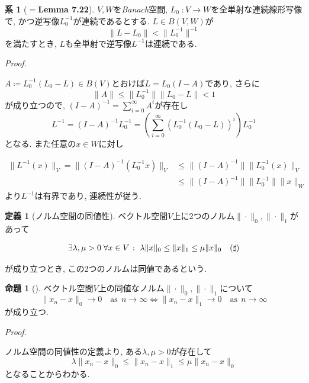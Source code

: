 \documentclass{jsarticle}
\renewenvironment{proof}[1][Proof]{%
\begin{proofbox}%
\textit{#1. }\ignorespaces
}{%
\hfill\qedsymbol%
\end{proofbox}%
}
\theoremstyle{definition}
\newtheorem{prop}[thm]{命題}
\newtheorem{cor}[thm]{系}
\newtheorem{dfn}[thm]{定義}
\begin{document}
\begin{cor}[$=$\textbf{Lemma 7.22}]
$V, W$を\textit{Banach}空間, $L_0\;\colon V\to W$を全単射な連続線形写像で, かつ逆写像$L_0^{-1}$が連続であるとする. $L\in B(V, W)$が
\[
\|L-L_0\|<\|L_0^{-1}\|^{-1}
\]
を満たすとき, $L$も全単射で逆写像$L^{-1}$は連続である.
\end{cor}
\begin{proof}
$A \coloneq L_0^{-1}(L_0-L)\in B(V)$とおけば$L= L_0(I-A)$であり, さらに
\[
\|A\|\le \|L_0^{-1}\|\|L_0-L\| < 1
\]
が成り立つので, $(I-A)^{-1}= \sum_{i=0}^{\infty}A^i$が存在し
\[
L^{-1} = (I-A)^{-1}L_0^{-1}= \left(\sum_{i=0}^{\infty} (L_0^{-1}(L_0-L))^i\right)L_0^{-1}
\]
となる. また任意の$x\in W$に対し

\begin{align*}
\|L^{-1}(x)\|_{V} = \|(I-A)^{-1}(L_0^{-1}x)\|_{V} & \le \|(I-A)^{-1}\|\|L_0^{-1}(x)\|_{V} \\
&\le \|(I-A)^{-1}\|\|L_0^{-1}\|\|x\|_W
\end{align*}
より$L^{-1}$は有界であり, 連続性が従う.

\end{proof}

\begin{dfn}[ノルム空間の同値性]
ベクトル空間$V$上に2つのノルム$\|\cdot\|_0, \|\cdot\|_1$があって

\[
\begin{aligned}
&\exists \lambda, \mu >0\; \forall x \in V \;\colon\; \lambda\|x\|_0 \le \|x\|_1 \le \mu\|x\|_0
\end{aligned}
\hfill (\sharp)
\]

が成り立つとき, この2つのノルムは同値であるという.
\end{dfn}

\begin{prop}[]
ベクトル空間$V$上の同値なノルム$\|\cdot\|_0, \|\cdot\|_1$について
\[
\|x_n-x\|_0\to 0\hspace{1em}\text{as}\:\:n\to\infty \Leftrightarrow \|x_n-x\|_1\to 0\hspace{1em}\text{as}\:\:n\to \infty
\]
が成り立つ.
\end{prop}
\begin{proof}
ノルム空間の同値性の定義より, ある$\lambda, \mu>0$が存在して
\[
\lambda \|x_n-x\|_0 \le \|x_n-x\|_1 \le \mu \|x_n-x\|_0
\]
となることからわかる.
\end{proof}
\end{document}
